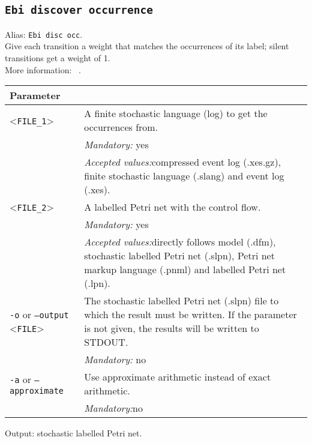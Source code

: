 {\subsection{\texttt{Ebi discover occurrence}}
Alias: \texttt{Ebi disc occ}.\\
Give each transition a weight that matches the occurrences of its label; silent transitions get a weight of 1.\\
More information: ~\cite{DBLP:conf/icpm/BurkeLW20}.\\
\begin{tabularx}{\linewidth}{lX}
\toprule
Parameter \\\midrule
<\texttt{FILE\_1}>&A finite stochastic language (log) to get the occurrences from.\\
&\textit{Mandatory:} \quad yes\\
&\textit{Accepted values:}\quad compressed event log (.xes.gz), finite stochastic language (.slang) and event log (.xes).\\
<\texttt{FILE\_2}>&A labelled Petri net with the control flow.\\
&\textit{Mandatory:} \quad yes\\
&\textit{Accepted values:}\quad directly follows model (.dfm), stochastic labelled Petri net (.slpn), Petri net markup language (.pnml) and labelled Petri net (.lpn).\\
\texttt{-o} or \texttt{--output} <\texttt{FILE}> &
The stochastic labelled Petri net (.slpn) file to which the result must be written. If the parameter is not given, the results will be written to STDOUT.\\
&\textit{Mandatory:} \quad no\\
\texttt{-a} or \texttt{--approximate} & Use approximate arithmetic instead of exact arithmetic.\\
&\textit{Mandatory:}\quad no\\
\bottomrule
\end{tabularx}
Output: stochastic labelled Petri net.
}
